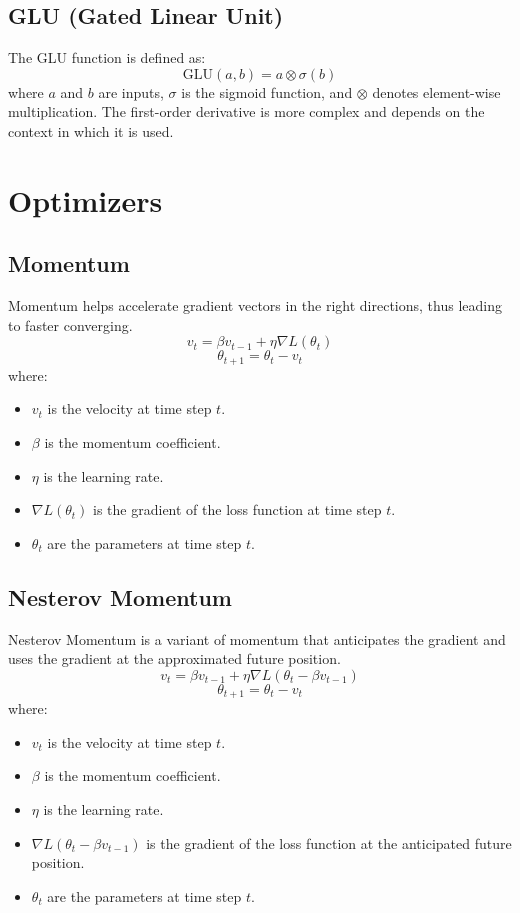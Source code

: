 \documentclass{article}
\begin{document}
\subsection{GLU (Gated Linear Unit)}
The GLU function is defined as:
\begin{equation}
\text{GLU}(a, b) = a \otimes \sigma(b)
\end{equation}
where \( a \) and \( b \) are inputs, \( \sigma \) is the sigmoid function, and \( \otimes \) denotes element-wise multiplication. The first-order derivative is more complex and depends on the context in which it is used.


\section{Optimizers}

\subsection{Momentum}
Momentum helps accelerate gradient vectors in the right directions, thus leading to faster converging.
\begin{equation}
v_t = \beta v_{t-1} + \eta \nabla L(\theta_t)
\end{equation}
\begin{equation}
\theta_{t+1} = \theta_t - v_t
\end{equation}
where:
\begin{itemize}
    \item $v_t$ is the velocity at time step $t$.
    \item $\beta$ is the momentum coefficient.
    \item $\eta$ is the learning rate.
    \item $\nabla L(\theta_t)$ is the gradient of the loss function at time step $t$.
    \item $\theta_t$ are the parameters at time step $t$.
\end{itemize}

\subsection{Nesterov Momentum}
Nesterov Momentum is a variant of momentum that anticipates the gradient and uses the gradient at the approximated future position.
\begin{equation}
v_t = \beta v_{t-1} + \eta \nabla L(\theta_t - \beta v_{t-1})
\end{equation}
\begin{equation}
\theta_{t+1} = \theta_t - v_t
\end{equation}
where:
\begin{itemize}
    \item $v_t$ is the velocity at time step $t$.
    \item $\beta$ is the momentum coefficient.
    \item $\eta$ is the learning rate.
    \item $\nabla L(\theta_t - \beta v_{t-1})$ is the gradient of the loss function at the anticipated future position.
    \item $\theta_t$ are the parameters at time step $t$.
\end{itemize}
\end{document}
